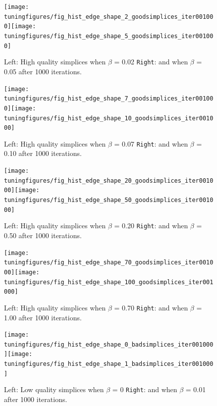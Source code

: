 \documentclass[10pt,a4paper]{book}
\begin{document}
\begin{figure}[tbhp]
\centerline{\texttt{[image: tuningfigures/fig\_hist\_edge\_shape\_2\_goodsimplices\_iter001000]}\hspace{3cm}\texttt{[image: tuningfigures/fig\_hist\_edge\_shape\_5\_goodsimplices\_iter001000]}}
\caption{\label{fig:fig_hist_edge_shape_2_goodsimplices_iter001000} Left: High quality simplices when $\beta$ = 0.02 \texttt{Right}: and when $\beta$ = 0.05 after 1000 iterations.}
\end{figure}

\begin{figure}[tbhp]
\centerline{\texttt{[image: tuningfigures/fig\_hist\_edge\_shape\_7\_goodsimplices\_iter001000]}\hspace{3cm}\texttt{[image: tuningfigures/fig\_hist\_edge\_shape\_10\_goodsimplices\_iter001000]}}
\caption{\label{fig:fig_hist_edge_shape_7_goodsimplices_iter001000} Left: High quality simplices when $\beta$ = 0.07 \texttt{Right}: and when $\beta$ = 0.10 after 1000 iterations.}
\end{figure}


\begin{figure}[tbhp]
\centerline{\texttt{[image: tuningfigures/fig\_hist\_edge\_shape\_20\_goodsimplices\_iter001000]}\hspace{3cm}\texttt{[image: tuningfigures/fig\_hist\_edge\_shape\_50\_goodsimplices\_iter001000]}}
\caption{\label{fig:fig_hist_edge_shape_20_goodsimplices_iter001000} Left: High quality simplices when $\beta$ = 0.20 \texttt{Right}: and when $\beta$ = 0.50 after 1000 iterations.}
\end{figure}

\begin{figure}[tbhp]
\centerline{\texttt{[image: tuningfigures/fig\_hist\_edge\_shape\_70\_goodsimplices\_iter001000]}\hspace{3cm}\texttt{[image: tuningfigures/fig\_hist\_edge\_shape\_100\_goodsimplices\_iter001000]}}
\caption{\label{fig:fig_hist_edge_shape_70_goodsimplices_iter001000} Left: High quality simplices when $\beta$ = 0.70 \texttt{Right}: and when $\beta$ = 1.00 after 1000 iterations.}
\end{figure}

\begin{figure}[tbhp]
\centerline{\texttt{[image: tuningfigures/fig\_hist\_edge\_shape\_0\_badsimplices\_iter001000]}\hspace{3cm}\texttt{[image: tuningfigures/fig\_hist\_edge\_shape\_1\_badsimplices\_iter001000]}}
\caption{\label{fig:fig_hist_edge_shape_0_badsimplices_iter001000} Left: Low quality simplices when $\beta$ = 0 \texttt{Right}: and when $\beta$ = 0.01 after 1000 iterations.}
\end{figure}
\end{document}
